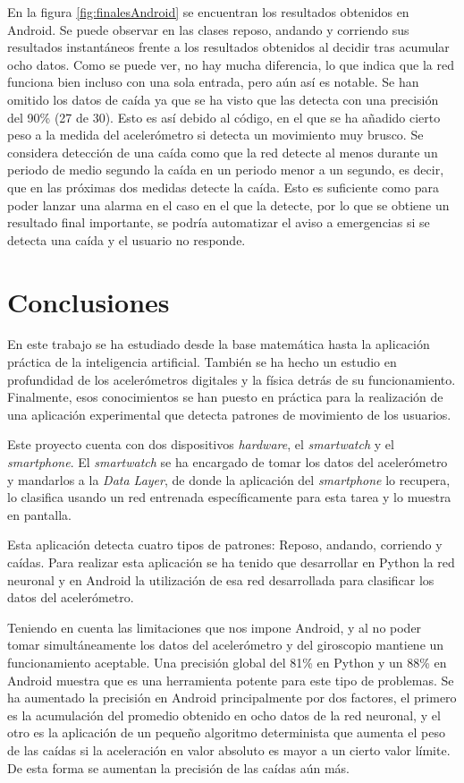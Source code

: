 \documentclass[12pt]{book}
\numberwithin{equation}{section}
\begin{document}
En la figura \ref{fig:finalesAndroid} se encuentran los resultados obtenidos en Android. Se puede observar en las clases reposo, andando y corriendo sus resultados instantáneos frente a los resultados obtenidos al decidir tras acumular ocho datos. Como se puede ver, no hay mucha diferencia, lo que indica que la red funciona bien incluso con una sola entrada, pero aún así es notable. Se han omitido los datos de caída ya que se ha visto que las detecta con una precisión del 90\% (27 de 30). Esto es así debido al código, en el que se ha añadido cierto peso a la medida del acelerómetro si detecta un movimiento muy brusco. Se considera detección de una caída como que la red detecte al menos durante un periodo de medio segundo la caída en un periodo menor a un segundo, es decir, que en las próximas dos medidas detecte la caída. Esto es suficiente como para poder lanzar una alarma en el caso en el que la detecte, por lo que se obtiene un resultado final importante, se podría automatizar el aviso a emergencias si se detecta una caída y el usuario no responde.

\newpage
\chapter{Conclusiones}

En este trabajo se ha estudiado desde la base matemática hasta la aplicación práctica de la inteligencia artificial. También se ha hecho un estudio en profundidad de los acelerómetros digitales y la física detrás de su funcionamiento. Finalmente, esos conocimientos se han puesto en práctica para la realización de una aplicación experimental que detecta patrones de movimiento de los usuarios.

Este proyecto cuenta con dos dispositivos \textit{hardware}, el \textit{smartwatch} y el \textit{smartphone}. El \textit{smartwatch} se ha encargado de tomar los datos del acelerómetro y mandarlos a la \textit{Data Layer}, de donde la aplicación del \textit{smartphone} lo recupera, lo clasifica usando un red entrenada específicamente para esta tarea y lo muestra en pantalla.

Esta aplicación detecta cuatro tipos de patrones: Reposo, andando, corriendo y caídas. Para realizar esta aplicación se ha tenido que desarrollar en Python la red neuronal y en Android la utilización de esa red desarrollada para clasificar los datos del acelerómetro.

Teniendo en cuenta las limitaciones que nos impone Android, y al no poder tomar simultáneamente los datos del acelerómetro y del giroscopio mantiene un funcionamiento aceptable. Una precisión global del 81\% en Python y un 88\% en Android muestra que es una herramienta potente para este tipo de problemas. Se ha aumentado la precisión en Android principalmente por dos factores, el primero es la acumulación del promedio obtenido en ocho datos de la red neuronal, y el otro es la aplicación de un pequeño algoritmo determinista que aumenta el peso de las caídas si la aceleración en valor absoluto es mayor a un cierto valor límite. De esta forma se aumentan la precisión de las caídas aún más.
\end{document}
